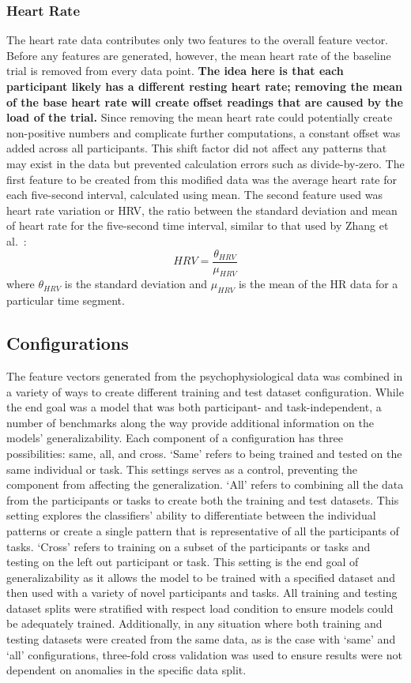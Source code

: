 \documentclass[11pt]{article}
\begin{document}
		\subsubsection{Heart Rate}
		The heart rate data contributes only two features to the overall feature vector. Before any features are generated, however, the mean heart rate of the baseline trial is removed from every data point. {\bf The idea here is that each participant likely has a different resting heart rate; removing the mean of the base heart rate will create offset readings that are caused by the load of the trial.} Since removing the mean heart rate could potentially create non-positive numbers and complicate further computations, a constant offset was added across all participants. This shift factor did not affect any patterns that may exist in the data but prevented calculation errors such as divide-by-zero. The first feature to be created from this modified data was the average heart rate for each five-second interval, calculated using mean. The second feature used was heart rate variation or HRV, the ratio between the standard deviation and mean of heart rate for the five-second time interval, similar to that used by Zhang et al.~\cite{Zhang}: \[HRV = \frac{\theta_{HRV}}{\mu_{HRV}}\] where \( \theta_{HRV} \) is the standard deviation and \( \mu_{HRV}\) is the mean of the HR data for a particular time segment.
				
		
	\subsection{Configurations}
	The feature vectors generated from the psychophysiological data was combined in a variety of ways to create different training and test dataset configuration. While the end goal was a model that was both participant- and task-independent, a number of benchmarks along the way provide additional information on the models' generalizability. Each component of a configuration has three possibilities: same, all, and cross. `Same' refers to being trained and tested on the same individual or task. This settings serves as a control, preventing the component from affecting the generalization. `All' refers to combining all the data from the participants or tasks to create both the training and test datasets. This setting explores the classifiers' ability to differentiate between the individual patterns or create a single pattern that is representative of all the participants of tasks. `Cross' refers to training on a subset of the participants or tasks and testing on the left out participant or task. This setting is the end goal of generalizability as it allows the model to be trained with a specified dataset and then used with a variety of novel participants and tasks. All training and testing dataset splits were stratified with respect load condition to ensure models could be adequately trained. Additionally, in any situation where both training and testing datasets were created from the same data, as is the case with `same' and `all' configurations, three-fold cross validation was used to ensure results were not dependent on anomalies in the specific data split.
	
\end{document}
